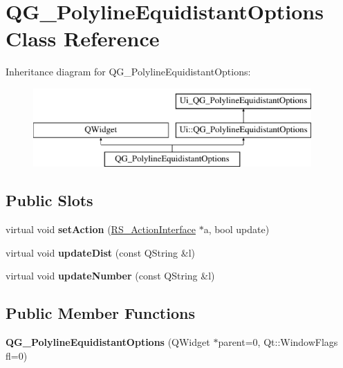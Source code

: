 \hypertarget{classQG__PolylineEquidistantOptions}{\section{Q\-G\-\_\-\-Polyline\-Equidistant\-Options Class Reference}
\label{classQG__PolylineEquidistantOptions}
}
Inheritance diagram for Q\-G\-\_\-\-Polyline\-Equidistant\-Options\-:\begin{figure}[H]
\begin{center}
\leavevmode
\includegraphics[height=3.000000cm]{classQG__PolylineEquidistantOptions}
\end{center}
\end{figure}
\subsection*{Public Slots}
\begin{DoxyCompactItemize}
\item 
\hypertarget{classQG__PolylineEquidistantOptions_ae88bcc15921e97473b65bf0fe743d6e4}{virtual void {\bfseries set\-Action} (\hyperlink{classRS__ActionInterface}{R\-S\-\_\-\-Action\-Interface} $\ast$a, bool update)}\label{classQG__PolylineEquidistantOptions_ae88bcc15921e97473b65bf0fe743d6e4}

\item 
\hypertarget{classQG__PolylineEquidistantOptions_a2c0d165ddd4bbee09f081cabb64d7c18}{virtual void {\bfseries update\-Dist} (const Q\-String \&l)}\label{classQG__PolylineEquidistantOptions_a2c0d165ddd4bbee09f081cabb64d7c18}

\item 
\hypertarget{classQG__PolylineEquidistantOptions_afb75f3bec2fb1037fc51288735380a94}{virtual void {\bfseries update\-Number} (const Q\-String \&l)}\label{classQG__PolylineEquidistantOptions_afb75f3bec2fb1037fc51288735380a94}

\end{DoxyCompactItemize}
\subsection*{Public Member Functions}
\begin{DoxyCompactItemize}
\item 
\hypertarget{classQG__PolylineEquidistantOptions_a28505c20fbcfb21657a6ed9acde47397}{{\bfseries Q\-G\-\_\-\-Polyline\-Equidistant\-Options} (Q\-Widget $\ast$parent=0, Qt\-::\-Window\-Flags fl=0)}\label{classQG__PolylineEquidistantOptions_a28505c20fbcfb21657a6ed9acde47397}

\end{DoxyCompactItemize}
